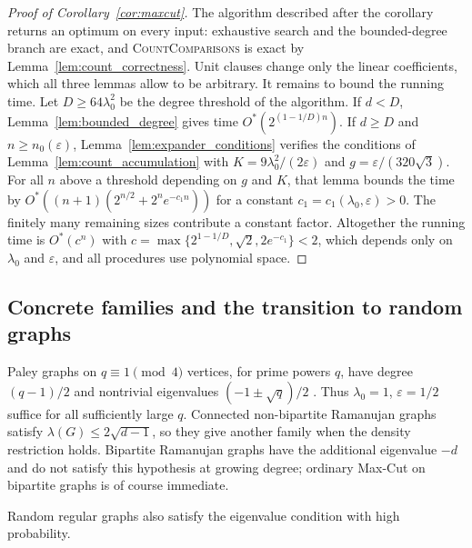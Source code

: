 \documentclass[11pt,a4paper]{article}
\theoremstyle{definition}
\theoremstyle{remark}
\newcommand{\Ostar}{O^{*}}
\begin{document}
\begin{proof}[Proof of Corollary~\ref{cor:maxcut}]
The algorithm described after the corollary returns an optimum on every
input: exhaustive search and the bounded-degree branch are exact, and
\textnormal{\textsc{CountComparisons}} is exact by
Lemma~\ref{lem:count_correctness}. Unit clauses change only the linear
coefficients, which all three lemmas allow to be arbitrary. It remains to
bound the running time. Let $D\ge64\lambda_0^2$ be the degree threshold of
the algorithm. If $d<D$, Lemma~\ref{lem:bounded_degree} gives time
$\Ostar(2^{(1-1/D)n})$. If $d\ge D$ and $n\ge n_0(\varepsilon)$,
Lemma~\ref{lem:expander_conditions} verifies the conditions of
Lemma~\ref{lem:count_accumulation} with $K=9\lambda_0^2/(2\varepsilon)$
and $g=\varepsilon/(320\sqrt3)$. For all $n$ above a threshold depending
on $g$ and $K$, that lemma bounds the time by
$\Ostar((n+1)(2^{n/2}+2^ne^{-c_1n}))$ for a constant
$c_1=c_1(\lambda_0,\varepsilon)>0$. The finitely many remaining sizes
contribute a constant factor. Altogether the running time is
$\Ostar(c^n)$ with $c=\max\{2^{1-1/D},\sqrt2,2e^{-c_1}\}<2$, which depends
only on $\lambda_0$ and $\varepsilon$, and all procedures use polynomial
space.
\end{proof}

\subsection{Concrete families and the transition to random graphs}
Paley graphs on $q\equiv1\pmod4$ vertices, for prime powers $q$, have
degree $(q-1)/2$ and nontrivial eigenvalues $(-1\pm\sqrt q)/2$
\cite[Section~9.1.2]{BH12}. Thus $\lambda_0=1$, $\varepsilon=1/2$
suffice for all sufficiently large $q$. Connected non-bipartite Ramanujan
graphs satisfy $\lambda(G)\le2\sqrt{d-1}$, so they give another family
when the density restriction holds. Bipartite Ramanujan graphs have the
additional eigenvalue $-d$ and do not satisfy this hypothesis at growing
degree; ordinary Max-Cut on bipartite graphs is of course immediate.

Random regular graphs also satisfy the eigenvalue condition with high
probability.
\end{document}
